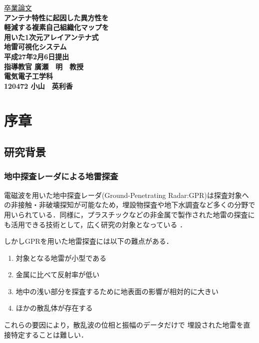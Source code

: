 ﻿\documentclass[12pt,oneside]{jsbook}
\begin{document}
\pagestyle{empty}
\begin{center}
\vspace*{3cm} \underline{\HUGE 卒業論文} \\
\vspace{0.5cm}
\bf{ \Huge アンテナ特性に起因した異方性を\\
\Huge 軽減する複素自己組織化マップを\\
\Huge 用いた1次元アレイアンテナ式\\
\Huge 地雷可視化システム }\\
\vspace{0.5cm}
\huge 平成27年2月6日提出 \\
\vspace{3cm}
\huge 指導教官 \hspace{5cm} 廣瀬　明　教授 \\
\vspace{2cm}
\huge 電気電子工学科 \\
\vspace{1cm}
\huge 120472 \hspace{5cm} 小山　英利香
\end{center}


\newpage 
\setcounter{page}{1}
\pagestyle{headings}
\tableofcontents

\newpage 
\chapter{序章}
\section{研究背景}
\subsection{地中探査レーダによる地雷探査}
電磁波を用いた地中探査レーダ(Ground-Penetrating Radar:GPR)は探査対象へ
の非接触・非破壊探知が可能なため，埋設物探査や地下水調査など多くの分野で
用いられている\cite{Arai}\cite{2007TCounts}．同様に，プラスチックなどの非金属で製作された地雷の探査に
も活用できる技術として，広く研究の対象となっている\cite{chichi}\cite{JeroenYarovoy}\cite{YaroboyLighthart}\cite{2004MSato}
\cite{2005Sato}\cite{2009Sato}．

しかしGPRを用いた地雷探査には以下の難点がある．
\begin{enumerate}
\item 対象となる地雷が小型である
\item 金属に比べて反射率が低い
\item 地中の浅い部分を探査するために地表面の影響が相対的に大きい
\item ほかの散乱体が存在する
\end{enumerate}
これらの要因により，散乱波の位相と振幅のデータだけで
埋設された地雷を直接特定することは難しい．
\end{document}
